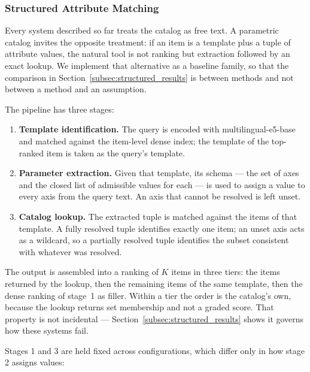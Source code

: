 \documentclass[preprint,review,12pt]{elsarticle}
\begin{document}
\subsubsection{Structured Attribute Matching}
\label{subsec:structured}

Every system described so far treats the catalog as free text. A parametric catalog invites the opposite treatment: if an item is a template plus a tuple of attribute values, the natural tool is not ranking but extraction followed by an exact lookup. We implement that alternative as a baseline family, so that the comparison in Section~\ref{subsec:structured_results} is between methods and not between a method and an assumption.

The pipeline has three stages:

\begin{enumerate}
    \item \textbf{Template identification.} The query is encoded with multilingual-e5-base and matched against the item-level dense index; the template of the top-ranked item is taken as the query's template.
    \item \textbf{Parameter extraction.} Given that template, its schema --- the set of axes and the closed list of admissible values for each --- is used to assign a value to every axis from the query text. An axis that cannot be resolved is left unset.
    \item \textbf{Catalog lookup.} The extracted tuple is matched against the items of that template. A fully resolved tuple identifies exactly one item; an unset axis acts as a wildcard, so a partially resolved tuple identifies the subset consistent with whatever was resolved.
\end{enumerate}

The output is assembled into a ranking of $K$ items in three tiers: the items returned by the lookup, then the remaining items of the same template, then the dense ranking of stage~1 as filler. Within a tier the order is the catalog's own, because the lookup returns set membership and not a graded score. That property is not incidental --- Section~\ref{subsec:structured_results} shows it governs how these systems fail.

Stages 1 and 3 are held fixed across configurations, which differ only in how stage 2 assigns values:
\end{document}
